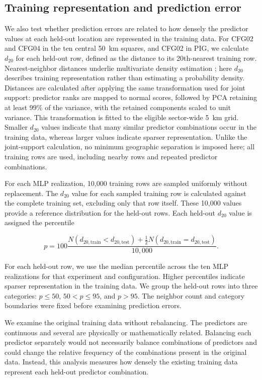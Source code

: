 \documentclass[review,jog]{igs}
\begin{document}
\subsection{Training representation and prediction error}
\label{app:training_representation}

We also test whether prediction errors are related to how densely the predictor values at each held-out location are represented in the training data. For CFG02 and CFG04 in the ten central 50~km squares, and CFG02 in PIG, we calculate $d_{20}$ for each held-out row, defined as the distance to its 20th-nearest training row. Nearest-neighbor distances underlie multivariate density estimation \citep{loftsgaarden1965nonparametric}; here $d_{20}$ describes training representation rather than estimating a probability density. Distances are calculated after applying the same transformation used for joint support: predictor ranks are mapped to normal scores, followed by PCA retaining at least 99\% of the variance, with the retained components scaled to unit variance. This transformation is fitted to the eligible sector-wide 5~km grid. Smaller $d_{20}$ values indicate that many similar predictor combinations occur in the training data, whereas larger values indicate sparser representation. Unlike the joint-support calculation, no minimum geographic separation is imposed here; all training rows are used, including nearby rows and repeated predictor combinations.

For each MLP realization, 10,000 training rows are sampled uniformly without
replacement. The $d_{20}$ value for each sampled training row is calculated
against the complete training set, excluding only that row itself. These
10,000 values provide a reference distribution for the held-out rows. Each
held-out $d_{20}$ value is assigned the percentile

\begin{equation}
p=100\frac{N(d_{20,\mathrm{train}}<d_{20,\mathrm{test}})
+\tfrac{1}{2}N(d_{20,\mathrm{train}}=d_{20,\mathrm{test}})}
{10{,}000}.
\end{equation}

For each held-out row, we use the median percentile across the ten MLP realizations for that experiment and configuration. Higher percentiles indicate sparser representation in the training data. We group the held-out rows into three categories: $p\leq50$, $50<p\leq95$, and $p>95$. The neighbor count and category boundaries were fixed before examining prediction errors.

We examine the original training data without rebalancing. The predictors are continuous and several are physically or mathematically related. Balancing each predictor separately would not necessarily balance combinations of predictors and could change the relative frequency of the combinations present in the original data. Instead, this analysis measures how densely the existing training data represent each held-out predictor combination.
\end{document}

